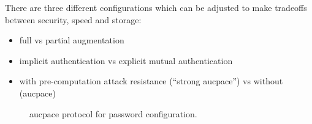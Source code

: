 There are three different configurations which can be adjusted to make tradeoffs between security, speed and storage:
\begin{itemize}
  \item{full vs partial augmentation}
  \item{implicit authentication vs explicit mutual authentication}
  \item{with pre-computation attack resistance (\enquote{strong \gls{aucpace}}) vs without (\gls{aucpace})}
\end{itemize}

\begin{figure}[H]

  \caption{\gls{aucpace} protocol for password configuration.}
  \label{fig:aucpace-store-pwd}
\end{figure}

